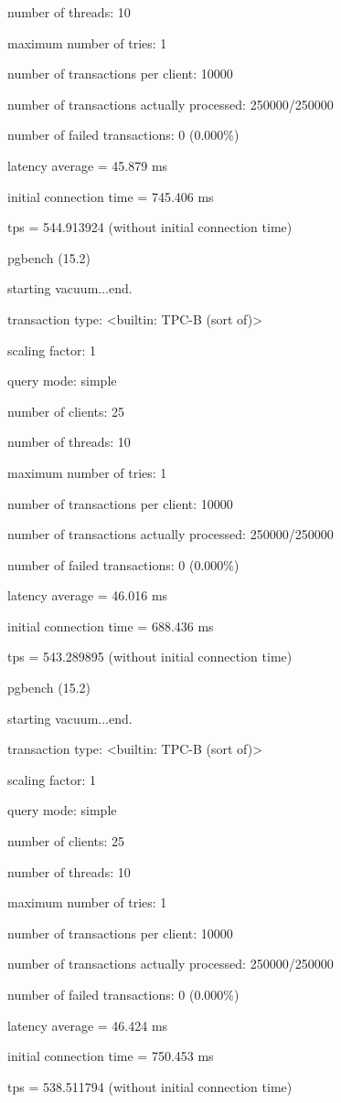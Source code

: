 number of threads: 10

maximum number of tries: 1

number of transactions per client: 10000

number of transactions actually processed: 250000/250000

number of failed transactions: 0 (0.000\%)

latency average = 45.879 ms

initial connection time = 745.406 ms

tps = 544.913924 (without initial connection time)

pgbench (15.2)

starting vacuum...end.

transaction type: <builtin: TPC-B (sort of)>

scaling factor: 1

query mode: simple

number of clients: 25

number of threads: 10

maximum number of tries: 1

number of transactions per client: 10000

number of transactions actually processed: 250000/250000

number of failed transactions: 0 (0.000\%)

latency average = 46.016 ms

initial connection time = 688.436 ms

tps = 543.289895 (without initial connection time)

pgbench (15.2)

starting vacuum...end.

transaction type: <builtin: TPC-B (sort of)>

scaling factor: 1

query mode: simple

number of clients: 25

number of threads: 10

maximum number of tries: 1

number of transactions per client: 10000

number of transactions actually processed: 250000/250000

number of failed transactions: 0 (0.000\%)

latency average = 46.424 ms

initial connection time = 750.453 ms

tps = 538.511794 (without initial connection time)

